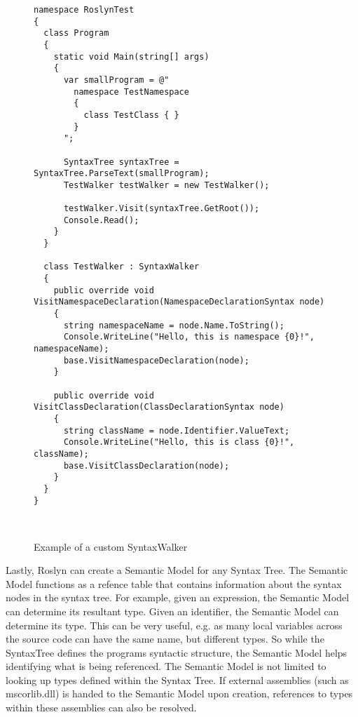 	\begin{figure}
		\begin{center}
			
		\begin{lstlisting}[language=CSharp,classoffset=1,morekeywords={Program,SyntaxTree,TestWalker,Console,SyntaxWalker,NamespaceDeclarationSyntax,ClassDeclarationSyntax}]
namespace RoslynTest
{
  class Program
  {
    static void Main(string[] args)
    {
      var smallProgram = @"
        namespace TestNamespace 
        {
          class TestClass { }
        }
      ";

      SyntaxTree syntaxTree = SyntaxTree.ParseText(smallProgram);
      TestWalker testWalker = new TestWalker();

      testWalker.Visit(syntaxTree.GetRoot());
      Console.Read();
    }
  }

  class TestWalker : SyntaxWalker
  {
    public override void VisitNamespaceDeclaration(NamespaceDeclarationSyntax node)
    {
      string namespaceName = node.Name.ToString();
      Console.WriteLine("Hello, this is namespace {0}!", namespaceName);
      base.VisitNamespaceDeclaration(node);
    }

    public override void VisitClassDeclaration(ClassDeclarationSyntax node)
    {
      string className = node.Identifier.ValueText;
      Console.WriteLine("Hello, this is class {0}!", className);
      base.VisitClassDeclaration(node);
    }
  }
}



		\end{lstlisting}
		\end{center}
		\caption{Example of a custom SyntaxWalker}
		\label{fig:roslyn_walker_example}
	\end{figure}

	Lastly, Roslyn can create a Semantic Model for any Syntax Tree. The Semantic Model functions as a refence table that contains information about the syntax nodes in the syntax tree. For example, given an expression, the Semantic Model can determine its resultant type. Given an identifier, the Semantic Model can determine its type. This can be very useful, e.g. as many local variables across the source code can have the same name, but different types. So while the SyntaxTree defines the programs syntactic structure, the Semantic Model helps identifying what is being referenced. The Semantic Model is not limited to looking up types defined within the Syntax Tree. If external assemblies (such as mscorlib.dll) is handed to the Semantic Model upon creation, references to types within these assemblies can also be resolved.

\FloatBarrier
